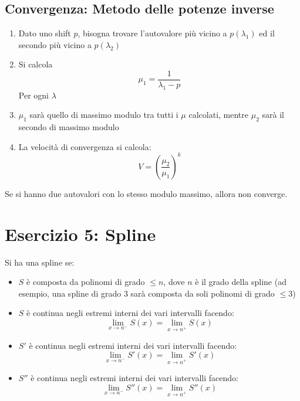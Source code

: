 \documentclass[10pt]{article}
\begin{document}
\subsection{Convergenza: Metodo delle potenze inverse}
\begin{enumerate}
    \item Dato uno shift $p$, bisogna trovare l'autovalore più vicino a $p(\lambda_{1})$ ed il secondo più vicino a $p(\lambda_{2})$
    \item Si calcola \begin{equation*}
        \mu_{1} = \frac{1}{\lambda_{1}-p}
    \end{equation*}
    Per ogni $\lambda$
    \item $\mu_{1}$ sarà quello di massimo modulo tra tutti i $\mu$ calcolati, mentre $\mu_{2}$ sarà il secondo di massimo modulo
    \item La velocità di convergenza si calcola: \begin{equation*}
        V = \left(\frac{\mu_{2}}{\mu_{1}}\right)^{k}
    \end{equation*}
\end{enumerate}
Se si hanno due autovalori con lo stesso modulo massimo, allora non converge.
\section{Esercizio 5: Spline}
Si ha una spline se:
\begin{itemize}
    \item $S$ è composta da polinomi di grado $\leq n$, dove $n$ è il grado della spline (ad esempio, una spline di grado 3 sarà composta da soli polinomi di grado $\leq 3$)
    \item $S$ è continua negli estremi interni dei vari intervalli facendo: \begin{equation*}
        \lim_{x\to n^{-}}S(x)=\lim_{x\to n^{+}}S(x)
    \end{equation*}
    \item $S'$ è continua negli estremi interni dei vari intervalli facendo: \begin{equation*}
        \lim_{x\to n^{-}}S'(x)=\lim_{x\to n^{+}}S'(x)
    \end{equation*}
    \item $S''$ è continua negli estremi interni dei vari intervalli facendo: \begin{equation*}
        \lim_{x\to n^{-}}S''(x)=\lim_{x\to n^{+}}S''(x)
    \end{equation*}
\end{itemize}
\end{document}
